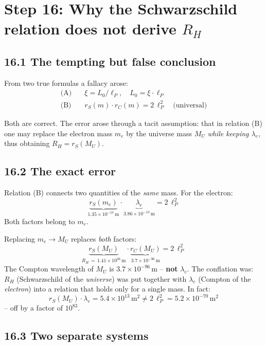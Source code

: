 \section{Step 16: Why the Schwarzschild relation does not derive $R_H$}

\subsection*{16.1 The tempting but false conclusion}

From two true formulas a fallacy arose:
\begin{align}
  \text{(A)} \quad & \xi = L_0/\ell_P, \quad L_0 = \xi\cdot\ell_P \\
  \text{(B)} \quad & r_S(m)\cdot r_C(m) = 2\,\ell_P^2 \quad\text{(universal)}
\end{align}

Both are correct. The error arose through a tacit assumption: that in
relation (B) one may replace the electron mass $m_e$ by the universe
mass $M_U$ \emph{while keeping $\lambda_e$}, thus obtaining
$R_H = r_S(M_U)$.

\subsection*{16.2 The exact error}

Relation (B) connects two quantities of the \emph{same} mass. For the
electron:
\[
  \underbrace{r_S(m_e)}_{1{.}35\times10^{-57}\,\text{m}}
  \cdot
  \underbrace{\lambda_e}_{3{.}86\times10^{-13}\,\text{m}}
  = 2\,\ell_P^2
\]
Both factors belong to $m_e$.

Replacing $m_e \to M_U$ replaces \emph{both} factors:
\[
  \underbrace{r_S(M_U)}_{R_H \,=\, 1{.}41\times10^{26}\,\text{m}}
  \cdot
  \underbrace{r_C(M_U)}_{3{.}7\times10^{-96}\,\text{m}}
  = 2\,\ell_P^2
\]
The Compton wavelength of $M_U$ is $3{.}7\times10^{-96}$\,m --
\textbf{not} $\lambda_e$. The conflation was: $R_H$ (Schwarzschild
of the \emph{universe}) was put together with $\lambda_e$ (Compton of
the \emph{electron}) into a relation that holds only for a
single mass. In fact:
\[
  r_S(M_U)\cdot\lambda_e
  = 5{.}4\times10^{13}\,\text{m}^2
  \neq 2\,\ell_P^2 = 5{.}2\times10^{-70}\,\text{m}^2
\]
-- off by a factor of $10^{83}$.

\subsection*{16.3 Two separate systems}

